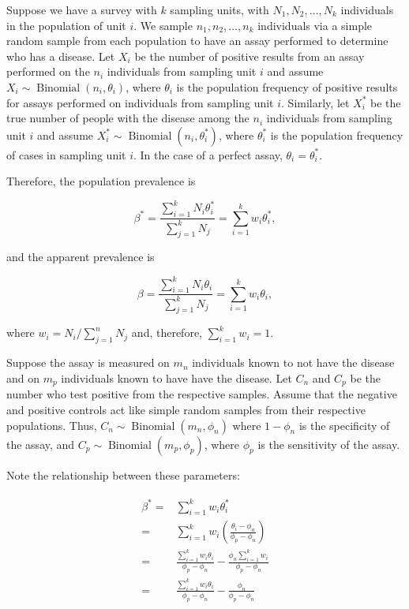 \documentclass[AMA,STIX1COL]{WileyNJD-v2}
\begin{document}
Suppose we have a survey with  \( k \) sampling units, with \( N_1, N_2, \ldots, N_k \) individuals in the population of unit \( i \).
We sample \( n_1, n_2, \ldots, n_k \) individuals via a simple random sample from each population to have an assay performed to determine who has a disease.
Let \( X_i \) be the number of positive results from an assay performed on the \( n_i \) individuals from sampling unit \( i \) and assume \( X_i \sim \operatorname{Binomial}(n_i, \theta_i) \), where \( \theta_i \) is the population frequency of positive results for assays performed on individuals from sampling unit \( i \).
Similarly, let \( X_i^* \) be the true number of people with the disease among the \( n_i \) individuals from sampling unit \( i \) and assume \( X_i^* \sim \operatorname{Binomial}(n_i, \theta_i^*) \), where \( \theta_i^* \) is the population frequency of cases in sampling unit \( i \).
In the case of a perfect assay, \( \theta_i = \theta_i^* \).

Therefore, the population prevalence is 

\begin{equation}
    \beta^* = \frac{\sum_{i=1}^k N_i \theta_i^*}{\sum_{j=1}^k N_j} = \sum_{i=1}^k w_i \theta_i^*,
    \label{eq:pop-prev}
\end{equation}

and the apparent prevalence is 

\begin{equation}
    \beta = \frac{\sum_{i=1}^k N_i \theta_i}{\sum_{j=1}^k N_j} = \sum_{i=1}^k w_i \theta_i,
    \label{eq:app-prev}
\end{equation}

where \( w_i = N_i / \sum_{j=1}^n N_j \) and, therefore, \( \sum_{i=1}^k w_i = 1 \).

Suppose the assay is measured on \( m_n \) individuals known to not have the disease and on \( m_p \) individuals known to have have the disease.
Let \( C_n \) and \( C_p \) be the number who test positive from the respective samples.
Assume that the negative and positive controls act like simple random samples from their respective populations.
Thus, \( C_n \sim \operatorname{Binomial}(m_n, \phi_n) \) where \( 1 - \phi_n \) is the specificity of the assay, and \( C_p \sim \operatorname{Binomial}(m_p, \phi_p) \), where  \( \phi_p \) is the sensitivity of the assay.

Note the relationship between these parameters:

\begin{align}
\begin{split}
  \beta^*   =&   \sum_{i=1}^k w_i \theta_i^* \\
            =&  \sum_{i=1}^k w_i \left( \frac{\theta_i - \phi_n}{\phi_p - \phi_n} \right) \\
            =&   \frac{\sum_{i=1}^k w_i \theta_i}{\phi_p - \phi_n} - \frac{\phi_n \sum_{i=1}^k w_i}{\phi_p - \phi_n} \\
            =&   \frac{\sum_{i=1}^k w_i \theta_i}{\phi_p - \phi_n} - \frac{\phi_n}{\phi_p - \phi_n}
            \label{eq:long-beta}
\end{split}
\end{align}
\end{document}
